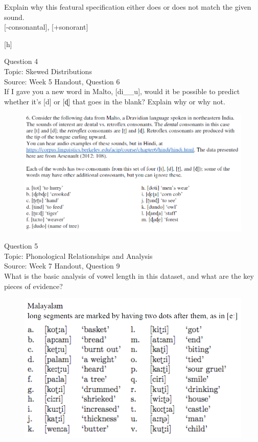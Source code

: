 \documentclass[12pt]{article}
\begin{document}
Explain why this featural specification either does or does not match the given sound.\\

{[-consonantal]}, {[+sonorant]}

{[h]}


\newpage

{\large Question 4}\\

Topic: Skewed Distributions\\
Source: Week 5 Handout, Question 6\\

If I gave you a new word in Malto, [di\_\_u], would it be possible to predict whether it's [d] or [ɖ] that goes in the blank? Explain why or why not.\\

\begin{figure}[H]
\includegraphics{../images/malto.png}
\end{figure}

\newpage

{\large Question 5}\\

Topic: Phonological Relationships and Analysis\\
Source: Week 7 Handout, Question 9\\

What is the basic analysis of vowel length in this dataset, and what are the key pieces of evidence?\\

\begin{figure}[H]
\includegraphics{../images/malayalam.png}
\end{figure}
\end{document}

